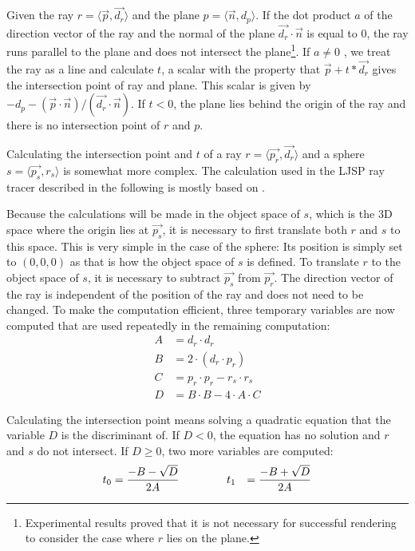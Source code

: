 \documentclass[11pt]{report}
\begin{document}
Given the ray $r = \langle \vec{p}, \vec{d_r} \rangle$ and the plane $p = \langle \vec{n}, d_p \rangle$. If the dot product $a$ of the direction vector of the ray and the normal of the plane $\vec{d_r} \cdot \vec{n}$ is equal to $0$, the ray runs parallel to the plane and does not intersect the plane\footnote{Experimental results proved that it is not necessary for successful rendering to consider the case where $r$ lies on the plane.}. If $a \neq 0$ , we treat the ray as a line and calculate $t$, a scalar with the property that $\vec{p} + t*\vec{d_r}$ gives the intersection point of ray and plane. This scalar is given by $-d_p-(\vec{p} \cdot \vec{n}) / (\vec{d_r} \cdot \vec{n})$. If $t < 0$, the plane lies behind the origin of the ray and there is no intersection point of $r$ and $p$.

Calculating the intersection point and $t$ of a ray $r = \langle \vec{p_r}, \vec{d_r} \rangle$ and a sphere $s = \langle \vec{p_s}, r_s \rangle$ is somewhat more complex. The calculation used in the LJSP ray tracer described in the following is mostly based on \cite{physrendering}.

Because the calculations will be made in the object space of $s$, which is the 3D space where the origin lies at $\vec{p_s}$, it is necessary to first translate both $r$ and $s$ to this space. This is very simple in the case of the sphere: Its position is simply set to $(0,0,0)$ as that is how the object space of $s$ is defined. To translate $r$ to the object space of $s$, it is necessary to subtract $\vec{p_s}$ from $\vec{p_r}$. The direction vector of the ray is independent of the position of the ray and does not need to be changed. To make the computation efficient, three temporary variables are now computed that are used repeatedly in the remaining computation:
\begin{equation*}
\begin{aligned}
A &= d_r \cdot d_r\\
B &= 2 \cdot (d_r \cdot p_r)\\
C &= p_r \cdot p_r - r_s \cdot r_s\\
D &= B \cdot B - 4 \cdot A \cdot C
\end{aligned}
\end{equation*}

Calculating the intersection point means solving a quadratic equation that the variable $D$ is the discriminant of. If $D < 0$, the equation has no solution and $r$ and $s$ do not intersect. If $D \geq 0$, two more variables are computed:
\begin{equation*}
\begin{aligned}
t_0 &= \frac{-B-\sqrt{D}}{2 A}\hspace{1.5cm}
t_1 &= \frac{-B+\sqrt{D}}{2 A}
\end{aligned}
\end{equation*}
\end{document}
